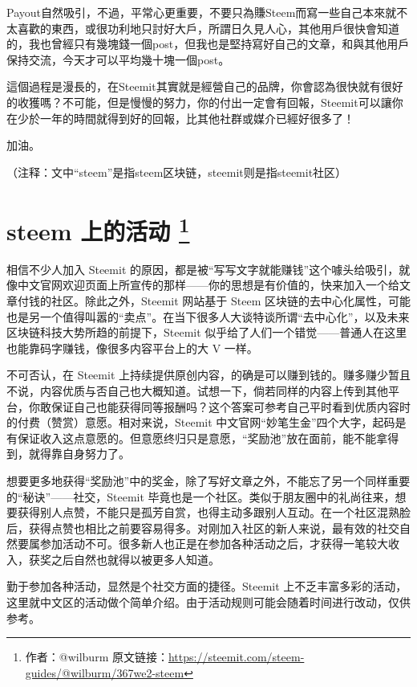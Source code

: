 \documentclass[]{ctexbook}
\begin{document}
Payout自然吸引，不過，平常心更重要，不要只為賺Steem而寫一些自己本來就不太喜歡的東西，或很功利地只討好大戶，所謂日久見人心，其他用戶很快會知道的，我也曾經只有幾塊錢一個post，但我也是堅持寫好自己的文章，和與其他用戶保持交流，今天才可以平均幾十塊一個post。

這個過程是漫長的，在Steemit其實就是經營自己的品牌，你會認為很快就有很好的收獲嗎？不可能，但是慢慢的努力，你的付出一定會有回報，Steemit可以讓你在少於一年的時間就得到好的回報，比其他社群或媒介已經好很多了！

加油。

（注释：文中``steem''是指steem区块链，steemit则是指steemit社区）

\hypertarget{activities}{%
\section[steem 上的活动 ]{\texorpdfstring{steem 上的活动 \footnote{作者：@wilburm 原文链接：\url{https://steemit.com/steem-guides/@wilburm/367we2-steem}}}{steem 上的活动 }}\label{activities}}

相信不少人加入 Steemit 的原因，都是被``写写文字就能赚钱''这个噱头给吸引，就像中文官网欢迎页面上所宣传的那样------你的思想是有价值的，快来加入一个给文章付钱的社区。除此之外，Steemit 网站基于 Steem 区块链的去中心化属性，可能也是另一个值得叫嚣的``卖点''。在当下很多人大谈特谈所谓``去中心化''，以及未来区块链科技大势所趋的前提下，Steemit 似乎给了人们一个错觉------普通人在这里也能靠码字赚钱，像很多内容平台上的大 V 一样。

不可否认，在 Steemit 上持续提供原创内容，的确是可以赚到钱的。赚多赚少暂且不说，内容优质与否自己也大概知道。试想一下，倘若同样的内容上传到其他平台，你敢保证自己也能获得同等报酬吗？这个答案可参考自己平时看到优质内容时的付费（赞赏）意愿。相对来说，Steemit 中文官网``妙笔生金''四个大字，起码是有保证收入这点意愿的。但意愿终归只是意愿，``奖励池''放在面前，能不能拿得到，就得靠自身努力了。

想要更多地获得``奖励池''中的奖金，除了写好文章之外，不能忘了另一个同样重要的``秘诀''------社交，Steemit 毕竟也是一个社区。类似于朋友圈中的礼尚往来，想要获得别人点赞，不能只是孤芳自赏，也得主动多跟别人互动。在一个社区混熟脸后，获得点赞也相比之前要容易得多。对刚加入社区的新人来说，最有效的社交自然要属参加活动不可。很多新人也正是在参加各种活动之后，才获得一笔较大收入，获奖之后自然也就得以被更多人知道。

勤于参加各种活动，显然是个社交方面的捷径。Steemit 上不乏丰富多彩的活动，这里就中文区的活动做个简单介绍。由于活动规则可能会随着时间进行改动，仅供参考。
\end{document}
